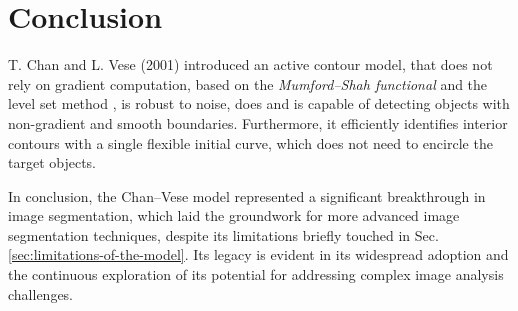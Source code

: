\documentclass[journal]{IEEEtran}
\begin{document}
\section{Conclusion}
T. Chan and L. Vese (2001) introduced an active contour model, that does not rely on gradient computation, based on the \emph{Mumford--Shah functional} \cite{MumfordShah} and the level set method \cite{Osher1988}, is robust to noise, does and is capable of detecting objects with non-gradient and smooth boundaries. Furthermore, it efficiently identifies interior contours with a single flexible initial curve, which does not need to encircle the target objects.

In conclusion, the Chan--Vese model represented a significant breakthrough in image segmentation, which laid the groundwork for more advanced image segmentation techniques, despite its limitations briefly touched in Sec. \ref{sec:limitations-of-the-model}. Its legacy is evident in its widespread adoption and the continuous exploration of its potential for addressing complex image analysis challenges.

\balance


\end{document}
